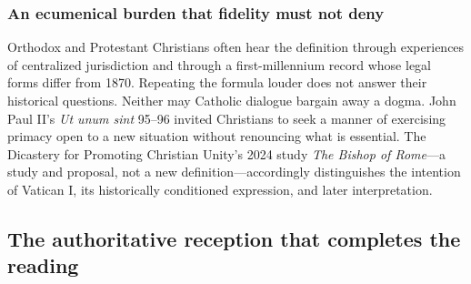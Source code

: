 \subsubsection{An ecumenical burden that fidelity must not deny}

Orthodox and Protestant Christians often hear the definition through experiences of centralized jurisdiction and through a first-millennium record whose legal forms differ from 1870. Repeating the formula louder does not answer their historical questions. Neither may Catholic dialogue bargain away a dogma. John Paul II's \emph{Ut unum sint} 95--96 invited Christians to seek a manner of exercising primacy open to a new situation without renouncing what is essential. The Dicastery for Promoting Christian Unity's 2024 study \emph{The Bishop of Rome}—a study and proposal, not a new definition—accordingly distinguishes the intention of Vatican I, its historically conditioned expression, and later interpretation.

\subsection{The authoritative reception that completes the reading}

